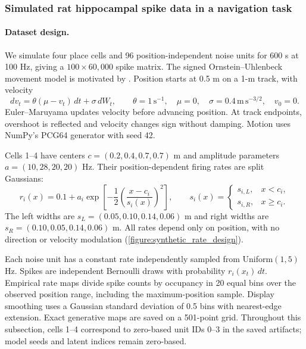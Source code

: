 \subsubsection{Simulated rat hippocampal spike data in a navigation task}
\label{subsubsection:synthetic_results_details}

\paragraph{Dataset design.}
We simulate four place cells and 96 position-independent noise units for 600 s at 100 Hz, giving a $100\times60{,}000$ spike matrix. The signed Ornstein--Uhlenbeck movement model is motivated by \citet{theodoni_2018_theta_ou}. Position starts at 0.5 m on a 1-m track, with velocity
\begin{equation}
dv_t=\theta(\mu-v_t)\,dt+\sigma\,dW_t,\qquad
\theta=1\,\mathrm{s}^{-1},\quad\mu=0,\quad
\sigma=0.4\,\mathrm{m}\,\mathrm{s}^{-3/2},\quad v_0=0.
\end{equation}
Euler--Maruyama updates velocity before advancing position. At track endpoints, overshoot is reflected and velocity changes sign without damping. Motion uses NumPy's PCG64 generator with seed 42.

Cells 1--4 have centers $c=(0.2,0.4,0.7,0.7)$ m and amplitude parameters $a=(10,28,20,20)$ Hz. Their position-dependent firing rates are split Gaussians:
\begin{equation}
r_i(x)=0.1+a_i\exp\left[-\frac{1}{2}\left(\frac{x-c_i}{s_i(x)}\right)^2\right],\qquad
s_i(x)=\begin{cases}s_{i,L},&x<c_i,\\s_{i,R},&x\geq c_i.\end{cases}
\end{equation}
The left widths are $s_L=(0.05,0.10,0.14,0.06)$ m and right widths are $s_R=(0.10,0.05,0.14,0.06)$ m. All rates depend only on position, with no direction or velocity modulation (\autoref{figure:synthetic_rate_design}).

Each noise unit has a constant rate independently sampled from Uniform$(1,5)$ Hz. Spikes are independent Bernoulli draws with probability $r_i(x_t)\,dt$. Empirical rate maps divide spike counts by occupancy in 20 equal bins over the observed position range, including the maximum-position sample. Display smoothing uses a Gaussian standard deviation of 0.5 bins with nearest-edge extension. Exact generative maps are saved on a 501-point grid. Throughout this subsection, cells 1--4 correspond to zero-based unit IDs 0--3 in the saved artifacts; model seeds and latent indices remain zero-based.

